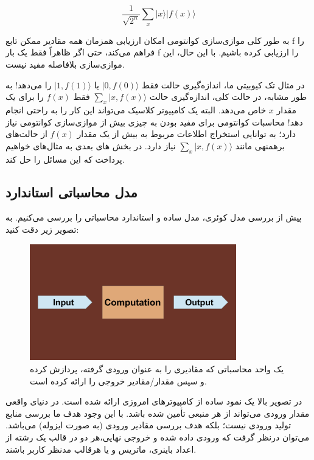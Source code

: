 \documentclass{book}
\begin{document}
\begin{center}
\begin{equation}
\frac{1}{\sqrt{2^n}} \sum_{x} \vert x \rangle \vert f (x)\rangle
\end{equation}
\end{center}


به طور کلی موازی‌سازی کوانتومی امکان ارزیابی همزمان همه مقادیر ممکن تابع f را فراهم می‌کند، حتی اگر ظاهراً فقط یک بار f را ارزیابی کرده باشیم. با این حال، این موازی‌سازی بلافاصله مفید نیست. 

در مثال تک کیوبیتی ما، اندازه‌گیری حالت فقط $\vert 0, f(0)\rangle$ یا $\vert 1, f(1)\rangle$ را می‌دهد! به طور مشابه، در حالت کلی، اندازه‌گیری حالت $\sum_{x} \vert x, f(x) \rangle$ فقط $ f (x)$ را برای یک مقدار $x$ خاص می‌دهد. البته یک کامپیوتر کلاسیک می‌تواند این کار را به راحتی انجام دهد! محاسبات کوانتومی برای مفید بودن به چیزی بیش از موازی‌سازی کوانتومی نیاز دارد؛ به توانایی استخراج اطلاعات مربوط به بیش از یک مقدار $f (x)$ از حالت‌های برهمنهی مانند $\sum _{x}\vert x, f(x) \rangle$ نیاز دارد. 
در بخش های بعدی به مثال‌های خواهیم پرداخت که این مسائل را حل کند.
\subsection{مدل محاسباتی استاندارد}
پیش از بررسی مدل کوئری،‌ مدل ساده و استاندارد محاسباتی را بررسی می‌کنیم. به تصویر زیر دقت کنید:

\begin{figure}[ht]
	\centering
	\includegraphics[width=0.8\textwidth]{standard computation model.png}
	\caption{یک واحد محاسباتی که مقادیری را به عنوان ورودی گرفته، پردازش کرده و سپس مقدار/مقادیر خروجی را ارائه کرده است.}
\end{figure}


در تصویر بالا یک نمود ساده از کامپیوتر‌های امروزی ارائه شده است. در دنیای واقعی مقدار ورودی می‌تواند از هر منبعی‌ تأمین شده باشد. با این وجود هدف ما بررسی منابع تولید ورودی نیست؛‌ بلکه هدف بررسی مقادیر ورودی (به صورت ایزوله) می‌باشد. می‌توان درنظر گرفت که ورودی داده شده و خروجی نهایی،‌هر دو در قالب یک رشته از اعداد باینری، ماتریس و یا هرقالب مدنظر کاربر باشند.
\end{document}
